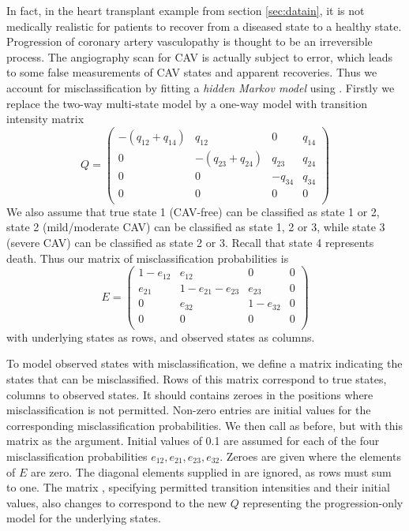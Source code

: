 In fact, in the heart transplant example from
section \ref{sec:datain}, it is not medically realistic for patients
to recover from a diseased state to a healthy state.  Progression of
coronary artery vasculopathy is thought to be an irreversible process.
The angiography scan for CAV is actually subject to error, which leads
to some false measurements of CAV states and apparent recoveries.
Thus we account for misclassification by fitting a \emph{hidden Markov
model} using .  Firstly we replace the two-way multi-state
model by a one-way model with transition intensity matrix
\[
Q = \left(
  \begin{array}{llll}
    -(q_{12} + q_{14}) & q_{12} &  0     & q_{14}\\
      0    & -(q_{23}+q_{24}) & q_{23} & q_{24}\\
      0    &   0    & -q_{34} & q_{34}\\
      0    &   0    &   0    &   0   \\
  \end{array}
\right )
\]
We also assume that true state 1 (CAV-free) can be classified as state
1 or 2, state 2 (mild/moderate CAV) can be classified as state 1, 2 or
3, while state 3 (severe CAV) can be classified as state 2 or 3.
Recall that state 4 represents death.  Thus our matrix of misclassification
probabilities is
\[
E = \left(
  \begin{array}{llll}
    1 - e_{12} & e_{12} & 0 & 0 \\
    e_{21} & 1 - e_{21} - e_{23} & e_{23} & 0 \\
    0 & e_{32} & 1 - e_{32} & 0 \\
    0 & 0 & 0 & 0\\
  \end{array}
  \right)
\]
with underlying states as rows, and observed states as columns.

To model observed states with misclassification, we define a matrix
 indicating the states that can be misclassified.
Rows of this matrix correspond to true states, columns to observed
states.  It should contains zeroes in the positions where
misclassification is not permitted.  Non-zero entries are initial
values for the corresponding misclassification probabilities. We then
call  as before, but with this matrix as the
 argument.  Initial values of 0.1 are assumed for
each of the four misclassification probabilities $e_{12}, e_{21},
e_{23}, e_{32}$.  Zeroes are given where the elements of $E$ are zero.
The diagonal elements supplied in  are ignored, as
rows must sum to one. The matrix , specifying
permitted transition intensities and their initial values, also
changes to correspond to the new $Q$ representing the progression-only
model for the underlying states.

